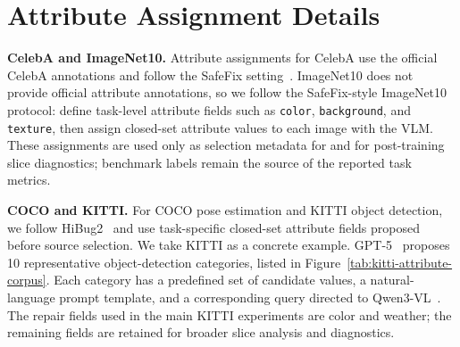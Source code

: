 \section{Attribute Assignment Details}
\label{app:attribute-assignment-details}

\noindent\textbf{CelebA and ImageNet10.}
Attribute assignments for CelebA use the official CelebA annotations and follow the SafeFix setting~\citep{xu2025safefix}. ImageNet10 does not provide official attribute annotations, so we follow the SafeFix-style ImageNet10 protocol: define task-level attribute fields such as \texttt{color}, \texttt{background}, and \texttt{texture}, then assign closed-set attribute values to each image with the VLM. These assignments are used only as selection metadata for \model and for post-training slice diagnostics; benchmark labels remain the source of the reported task metrics.

\noindent\textbf{COCO and KITTI.}
For COCO pose estimation and KITTI object detection, we follow HiBug2~\citep{chen2025hibug2} and use task-specific closed-set attribute fields proposed before source selection. We take KITTI as a concrete example. GPT-5~\citep{openai2025gpt5} proposes 10 representative object-detection categories, listed in Figure~\ref{tab:kitti-attribute-corpus}. Each category has a predefined set of candidate values, a natural-language prompt template, and a corresponding query directed to Qwen3-VL~\citep{bai2025qwen3vl}. The repair fields used in the main KITTI experiments are color and weather; the remaining fields are retained for broader slice analysis and diagnostics.

